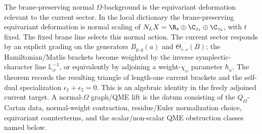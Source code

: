 \medskip
The brane-preserving normal \(\Omega\)-background is the
equivariant deformation relevant to the current sector.  In the local dictionary the brane-preserving
equivariant deformation is normal scaling of
\(N_LX=\R_s\oplus\C_{z_1}\oplus\C_{z_2}\), with \(t\) fixed.  The fixed
brane line selects this normal action.  The current sector responds
by an explicit grading on the generators
\(B_{p,q}(a)\) and \(\Theta_{r,s}(B)\); the Hamiltonian/Matlis
brackets become weighted by the inverse symplectic-character line
\(\mathbb L_\omega^{-1}\), or equivalently by adjoining a
weight-\(\chi_\omega\) parameter \(\hbar_\omega\).  The theorem records
the resulting triangle of length-one current brackets and the
self-dual specialization \(\epsilon_1+\epsilon_2=0\).  This is an
  algebraic identity in the freely adjoined current target.  A
  normal-\(\Omega\) graph/QME lift is the datum consisting of the
  \(Q_\Omega\)-Cartan data, normal-weight contraction,
  residue/Euler normalization choice, equivariant counterterms, and the
  scalar/non-scalar QME obstruction classes named below.

